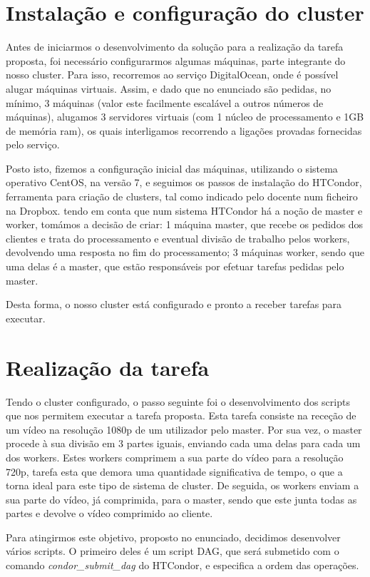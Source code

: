 \documentclass[a4paper]{report}
\begin{document}
    \section{Instalação e configuração do cluster}
	Antes de iniciarmos o desenvolvimento da solução para a realização da tarefa proposta, foi necessário configurarmos algumas máquinas, parte integrante do nosso cluster. Para isso, recorremos ao serviço DigitalOcean, onde é possível alugar máquinas virtuais. Assim, e dado que no enunciado são pedidas, no mínimo, 3 máquinas (valor este facilmente escalável a outros números de máquinas), alugamos 3 servidores virtuais (com 1 núcleo de processamento e 1GB de memória ram), os quais interligamos recorrendo a ligações provadas fornecidas pelo serviço.
	
	Posto isto, fizemos a configuração inicial das máquinas, utilizando o sistema operativo CentOS, na versão 7, e seguimos os passos de instalação do HTCondor, ferramenta para criação de clusters, tal como indicado pelo docente num ficheiro na Dropbox.
	tendo em conta que num sistema HTCondor há a noção de master e worker, tomámos a decisão de criar: 1 máquina master, que recebe os pedidos dos clientes e trata do processamento e eventual divisão de trabalho pelos workers, devolvendo uma resposta no fim do processamento; 3 máquinas worker, sendo que uma delas é a master, que estão responsáveis por efetuar tarefas pedidas pelo master.
	
	Desta forma, o nosso cluster está configurado e pronto a receber tarefas para executar.
    
    \section{Realização da tarefa}
    Tendo o cluster configurado, o passo seguinte foi o desenvolvimento dos scripts que nos permitem executar a tarefa proposta. Esta tarefa consiste na receção de um vídeo na resolução 1080p de um utilizador pelo master. Por sua vez, o master procede à sua divisão em 3 partes iguais, enviando cada uma delas para cada um dos workers. Estes workers comprimem a sua parte do vídeo para a resolução 720p, tarefa esta que demora uma quantidade significativa de tempo, o que a torna ideal para este tipo de sistema de cluster. De seguida, os workers enviam a sua parte do vídeo, já comprimida, para o master, sendo que este junta todas as partes e devolve o vídeo comprimido ao cliente.
    
    Para atingirmos este objetivo, proposto no enunciado, decidimos desenvolver vários scripts. O primeiro deles é um script DAG, que será submetido com o comando \textit{condor\_submit\_dag} do HTCondor, e especifica a ordem das operações.
\end{document}
